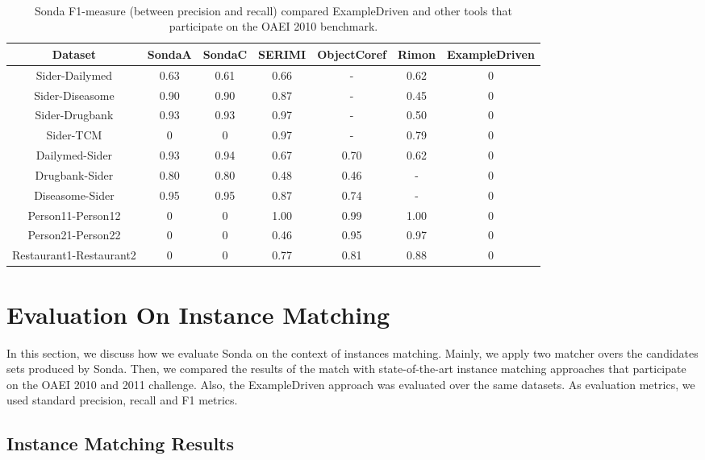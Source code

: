 \begin{center}
\begin{table*}[h]
\centering
\scriptsize\tt
\caption{Sonda  F1-measure (between precision and recall) compared ExampleDriven and  other tools that participate on the OAEI 2010 benchmark.} 
\begin{tabular}{|c|c|c|c|c|c|c|}
\hline
Dataset &  SondaA &  SondaC & SERIMI & ObjectCoref & Rimon & ExampleDriven \\ \hline
Sider-Dailymed & 0.63 & 0.61   & 0.66 & - & 0.62  & 0\\ \hline
Sider-Diseasome & 0.90 & 0.90   & 0.87 & - & 0.45 & 0\\ \hline
Sider-Drugbank & 0.93 & 0.93  & 0.97 & - & 0.50  & 0\\ \hline
Sider-TCM & 0 & 0  & 0.97 & - & 0.79 &  0\\ \hline
Dailymed-Sider & 0.93  & 0.94 & 0.67 & 0.70 & 0.62  & 0\\ \hline
Drugbank-Sider & 0.80  & 0.80 & 0.48 & 0.46 & -  & 0\\ \hline
Diseasome-Sider & 0.95 & 0.95   & 0.87 & 0.74 & -  & 0\\ \hline
Person11-Person12 & 0 & 0  & 1.00 & 0.99 & 1.00  & 0\\ \hline
Person21-Person22 & 0 & 0  & 0.46 & 0.95 & 0.97 & 0\\ \hline
Restaurant1-Restaurant2 & 0 & 0  & 0.77 & 0.81  & 0.88 & 0\\ \hline
 								 									 
\end{tabular}  
\end{table*} 
\end{center}



\section{Evaluation On Instance Matching}
In this section, we discuss how we evaluate Sonda on the context of instances matching.  Mainly, we apply two matcher overs the candidates sets produced by Sonda. Then, we compared the results of the match with state-of-the-art instance matching approaches that participate on the OAEI 2010 and 2011 challenge. Also, the ExampleDriven approach was evaluated over the same datasets. As evaluation metrics, we used standard precision, recall and F1 metrics. 

\subsection{Instance Matching Results} 


